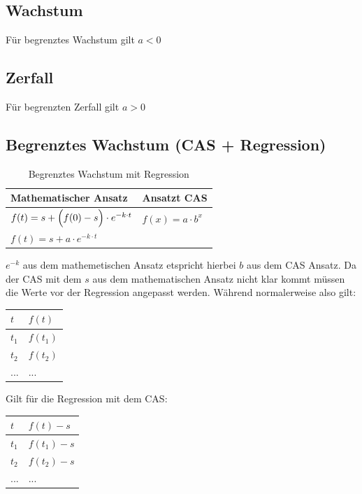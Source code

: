 \documentclass[a4paper,12pt]{article}
\begin{document}
\subsection{Wachstum}
Für begrenztes Wachstum gilt $a < 0$
\subsection{Zerfall}
Für begrenzten Zerfall gilt $a > 0$
\pagebreak
\subsection{Begrenztes Wachstum (CAS + Regression)}
\begin{table}[h!]
  \begin{center}
    \caption{Begrenztes Wachstum mit Regression}
    \label{tab:table1}
    \begin{tabular}{l|l} %
      \textbf{Mathematischer Ansatz} & \textbf{Ansatzt CAS}\\
      \hline
      $f(t) = s + \Big{(}f(0) -s\Big{)} \cdot e^{-k \cdot t}$ & $f(x) = a \cdot b^x$\\
      $f(t) = s + a \cdot e^{-k \cdot t}$ & 
    \end{tabular}
  \end{center}
\end{table}
$e^{-k}$ aus dem mathemetischen Ansatz etspricht hierbei $b$ aus dem CAS Ansatz.
Da der CAS mit dem $s$ aus dem mathematischen Ansatz nicht klar kommt müssen die Werte vor der Regression angepasst werden.
Während normalerweise also gilt:
\FloatBarrier
\begin{table}[h!]
  \begin{center}
    \label{tab:table1}
    \begin{tabular}{l|l} %
      $t$ & $f(t)$\\
      \hline
      $t_1$ & $f(t_1)$\\
      $t_2$ & $f(t_2)$\\
      ... & ...
    \end{tabular}
  \end{center}
\end{table}
\FloatBarrier
Gilt für die Regression mit dem CAS:
\FloatBarrier
\begin{table}[h!]
  \begin{center}
    \label{tab:table1}
    \begin{tabular}{l|l} %
      $t$ & $f(t) - s$\\
      \hline
      $t_1$ & $f(t_1) - s$\\
      $t_2$ & $f(t_2) - s$\\
      ... & ...
    \end{tabular}
  \end{center}
\end{table}
\end{document}
